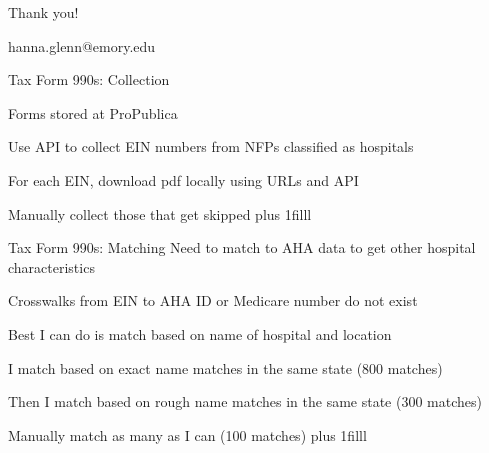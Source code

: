 \documentclass[notes,11pt, aspectratio=169]{beamer}
\newcommand{\btVFill}{\vskip0pt plus 1filll}
\newenvironment{wideitemize}{\itemize\addtolength{\itemsep}{10pt}}{\enditemize}
\begin{document}
\begin{frame}{}
    \Large
    \centering

    \textcolor{sage}{Thank you!}

    \vspace{5mm}

    \textcolor{sage}{hanna.glenn@emory.edu}

\end{frame}



\begin{frame}[noframenumbering]{Tax Form 990s: Collection}\label{990s}

\vspace{5mm}
    \begin{wideitemize}
        \item Forms stored at ProPublica
        \item Use API to collect EIN numbers from NFPs classified as hospitals 
        \item For each EIN, download pdf locally using URLs and API
        \item Manually collect those that get skipped
    \end{wideitemize}
    \btVFill

    \hyperlink{clinexecs}{}
\end{frame}

\begin{frame}[noframenumbering]{Tax Form 990s: Matching}
\vspace{5mm}
    Need to match to AHA data to get other hospital characteristics
    \vspace{3mm}
    \begin{wideitemize}
        \item Crosswalks from EIN to AHA ID or Medicare number do not exist
        \item Best I can do is match based on name of hospital and location
        \item I match based on exact name matches in the same state (800 matches)
        \item Then I match based on rough name matches in the same state (300 matches)
        \item Manually match as many as I can (100 matches)
    \end{wideitemize}
    \btVFill

    \hyperlink{clinexecs}{}
\end{frame}
\end{document}
